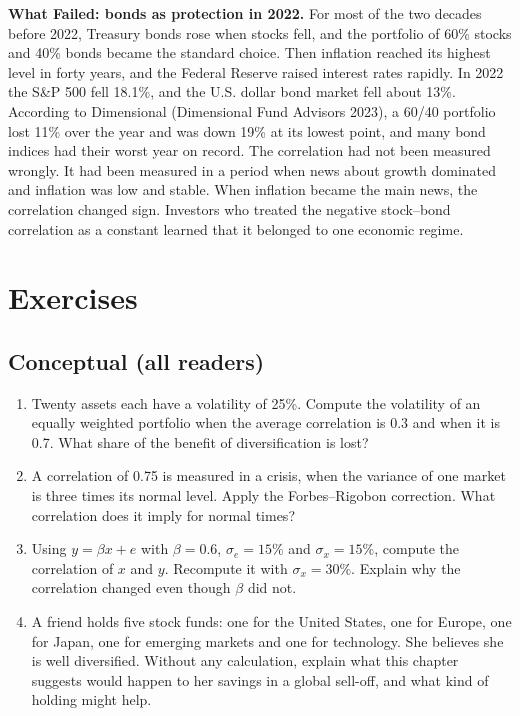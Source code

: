 \begin{callout}
\textbf{What Failed: bonds as protection in 2022.} For most of the two decades before 2022, Treasury bonds rose when stocks fell, and the portfolio of 60\% stocks and 40\% bonds became the standard choice. Then inflation reached its highest level in forty years, and the Federal Reserve raised interest rates rapidly. In 2022 the S\&P 500 fell 18.1\%, and the U.S. dollar bond market fell about 13\%. According to Dimensional (Dimensional Fund Advisors 2023), a 60/40 portfolio lost 11\% over the year and was down 19\% at its lowest point, and many bond indices had their worst year on record. The correlation had not been measured wrongly. It had been measured in a period when news about growth dominated and inflation was low and stable. When inflation became the main news, the correlation changed sign. Investors who treated the negative stock--bond correlation as a constant learned that it belonged to one economic regime.
\end{callout}

\section*{Exercises}

\subsection*{Conceptual (all readers)}

\begin{enumerate}
  \item Twenty assets each have a volatility of 25\%. Compute the volatility of an equally weighted portfolio when the average correlation is 0.3 and when it is 0.7. What share of the benefit of diversification is lost?
  \item A correlation of 0.75 is measured in a crisis, when the variance of one market is three times its normal level. Apply the Forbes--Rigobon correction. What correlation does it imply for normal times?
  \item Using $y = \beta x + e$ with $\beta = 0.6$, $\sigma_e = 15\%$ and $\sigma_x = 15\%$, compute the correlation of $x$ and $y$. Recompute it with $\sigma_x = 30\%$. Explain why the correlation changed even though $\beta$ did not.
  \item A friend holds five stock funds: one for the United States, one for Europe, one for Japan, one for emerging markets and one for technology. She believes she is well diversified. Without any calculation, explain what this chapter suggests would happen to her savings in a global sell-off, and what kind of holding might help.
\end{enumerate}

